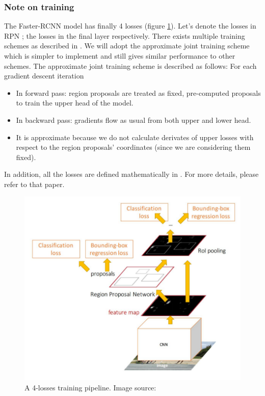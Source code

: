 \subsubsection{Note on training}
The Faster-RCNN model has finally 4 losses (figure \ref{fig:lossFasterRCNN}). Let's denote the losses in RPN ; the losses in the final layer  respectively. There exists multiple training schemes as described in \cite{DBLP:journals/corr/RenHG015}. We will adopt the approximate joint training scheme which is simpler to implement and still gives similar performance to other schemes. The approximate joint training scheme is described as follows: 
For each gradient descent iteration
\begin{itemize}
	\item In forward pass: region proposals are treated as fixed, pre-computed proposals to train the upper head of the model.
	\item In backward pass: gradients flow as usual from both upper and lower head. 
	\item It is approximate because we do not calculate derivates of upper losses with respect to the region proposals' coordinates (since we are considering them fixed).
\end{itemize}
In addition, all the losses are defined mathematically in \cite{DBLP:journals/corr/RenHG015}. For more details, please refer to that paper.

\begin{figure}[tb]
	\centering
	\includegraphics[width=0.8\hsize]{./figures/lossFasterRCNN}
	\caption{A 4-losses training pipeline. Image source: \cite{cs231n}}
	\label{fig:lossFasterRCNN}
\end{figure}

